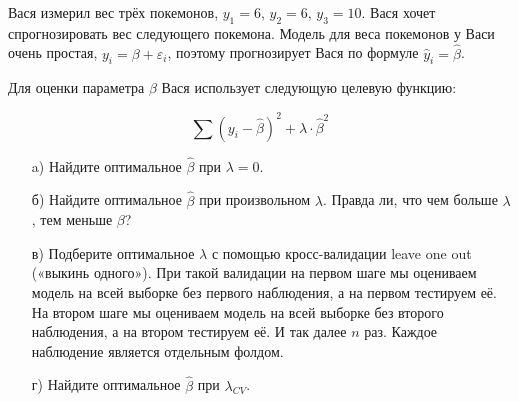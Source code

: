 \documentclass[12pt, a4paper, oneside]{article}
\newcounter{problem}
\renewcommand{\theproblem}{\arabic{problem}}
\newcommand{\problemname}{Задача}
\newenvironment{problem}{
	\addtocounter{problem}{1}\noindent{ \color{myblue} \large\bfseries \problemname{} \theproblem \newline }
}{
	\par\bigskip
}
\renewcommand{\hat}{\widehat}
\begin{document}
\begin{problem}
	Вася измерил вес трёх покемонов,  $y_1=6$, $y_2=6$, $y_3=10$.  Вася хочет спрогнозировать вес следующего покемона. Модель для веса покемонов у Васи очень простая, $y_i = \beta + \varepsilon_i$, поэтому прогнозирует Вася по формуле $\hat y_i = \hat \beta$.
	
	Для оценки параметра $\beta$ Вася использует следующую целевую функцию:
	
	\[
	\sum (y_i - \hat \beta)^2 + \lambda \cdot \hat \beta^2
	\]
	
	\begin{enumerate}
		\item[a)] Найдите оптимальное $\hat \beta$ при $\lambda =0$.
		\item[б)] Найдите оптимальное $\hat \beta$ при произвольном $\lambda$. Правда ли, что чем больше $\lambda$, тем меньше $\beta$? 
		\item[в)] Подберите оптимальное $\lambda$ с помощью кросс-валидации leave one out («выкинь одного»). При такой валидации на первом шаге мы оцениваем модель на всей выборке без первого наблюдения, а на первом тестируем её. На втором шаге мы оцениваем модель на всей выборке без второго наблюдения, а на втором тестируем её. И так далее $n$ раз. Каждое наблюдение является отдельным фолдом.
		\item[г)] Найдите оптимальное $\hat \beta$ при $\lambda_{CV}$.
	\end{enumerate}
\end{problem}
\end{document}
